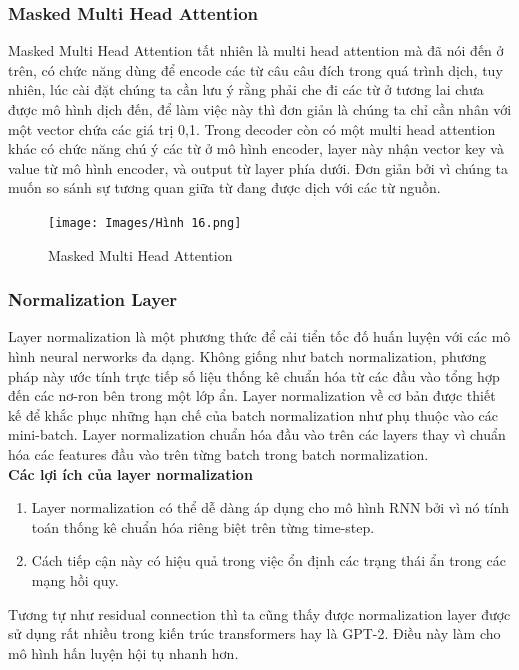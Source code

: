 \documentclass[a4paper]{article}
\theoremstyle{definition}
\begin{document}
\subsubsection{Masked Multi Head Attention}
Masked Multi Head Attention tất nhiên là multi head attention mà đã nói đến ở trên, có chức năng dùng để encode các từ câu câu đích trong quá trình dịch, tuy nhiên, lúc cài đặt chúng ta cần lưu ý rằng phải che đi các từ ở tương lai chưa được mô hình dịch đến, để làm việc này thì đơn giản là chúng ta chỉ cần nhân với một vector chứa các giá trị 0,1.
Trong decoder còn có một multi head attention khác có chức năng chú ý các từ ở mô hình encoder, layer này nhận vector key và value từ mô hình encoder, và output từ layer phía dưới. Đơn giản bởi vì chúng ta muốn so sánh sự tương quan giữa từ đang được dịch với các từ nguồn.

\begin{figure}[h!]
\begin{center}
\texttt{[image: Images/Hình 16.png]} \\[0.25in]

\caption{Masked Multi Head Attention}
\end{center}
\end{figure}
\subsubsection{Normalization Layer}
Layer normalization là một phương thức để cải tiển tốc đố huấn luyện với các mô hình neural nerworks đa dạng. Không giống như batch normalization, phương pháp này ước tính trực tiếp số liệu thống kê chuẩn hóa từ các đầu vào tổng hợp đến các nơ-ron bên trong một lớp ẩn. Layer normalization về cơ bản được thiết kế để khắc phục những hạn chế của batch normalization như phụ thuộc vào các mini-batch. Layer normalization chuẩn hóa đầu vào trên các layers thay vì chuẩn hóa các features đầu vào trên từng batch trong batch normalization.\\
\textbf{Các lợi ích của layer normalization}
\begin{enumerate}[1.]

\item Layer normalization có thể dễ dàng áp dụng cho mô hình RNN bởi vì nó tính toán thống kê chuẩn hóa riêng biệt trên từng time-step.
\item Cách tiếp cận này có hiệu quả trong việc ổn định các trạng thái ẩn trong các mạng hồi quy.
\end{enumerate}
Tương tự như residual connection thì ta cũng thấy được normalization layer được sử dụng rất nhiều trong kiến trúc transformers hay là GPT-2. Điều này làm cho mô hình hấn luyện hội tụ nhanh hơn. 
\end{document}
